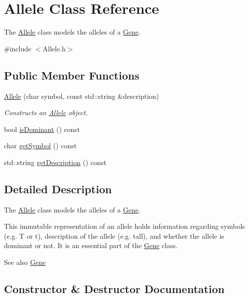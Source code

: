 \hypertarget{class_allele}{}\section{Allele Class Reference}
\label{class_allele}


The \hyperlink{class_allele}{Allele} class models the alleles of a \hyperlink{class_gene}{Gene}.  




{\ttfamily \#include $<$Allele.\+h$>$}

\subsection*{Public Member Functions}
\begin{DoxyCompactItemize}
\item 
\hyperlink{class_allele_a22adf689d715473f8a14fdc2ac80e167}{Allele} (char symbol, const std\+::string \&description)
\begin{DoxyCompactList}\small\item\em Constructs an \hyperlink{class_allele}{Allele} object. \end{DoxyCompactList}\item 
bool \hyperlink{class_allele_a6096e43a00dfc291544abd97b4a82c06}{is\+Dominant} () const 
\item 
char \hyperlink{class_allele_afc738a4cfcc3e69e07baf2e196570c0a}{get\+Symbol} () const 
\item 
std\+::string \hyperlink{class_allele_a332bec024b1be3eff4ba984320aed490}{get\+Description} () const 
\end{DoxyCompactItemize}


\subsection{Detailed Description}
The \hyperlink{class_allele}{Allele} class models the alleles of a \hyperlink{class_gene}{Gene}. 

This immutable representation of an allele holds information regarding symbols (e.\+g. T or t), description of the allele (e.\+g. tall), and whether the allele is dominant or not. It is an essential part of the \hyperlink{class_gene}{Gene} class. \begin{DoxySeeAlso}{See also}
\hyperlink{class_gene}{Gene} 
\end{DoxySeeAlso}


\subsection{Constructor \& Destructor Documentation}
